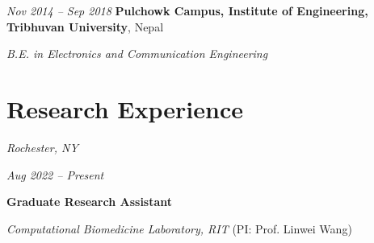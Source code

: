\documentclass[10pt, letterpaper]{article}
\begin{document}
    \vspace{0.2 cm}

    \begin{twocolentry}{
        \textit{Nov 2014 – Sep 2018}}
        \textbf{Pulchowk Campus, Institute of Engineering, Tribhuvan University}, Nepal

        \textit{B.E. in Electronics and Communication Engineering}
    \end{twocolentry}


    \section{Research Experience}

    \begin{twocolentry}{
        \textit{Rochester, NY}

        \textit{Aug 2022 – Present}}
        \textbf{Graduate Research Assistant}

        \textit{Computational Biomedicine Laboratory, RIT} (PI: Prof. Linwei Wang)
    \end{twocolentry}
\end{document}
